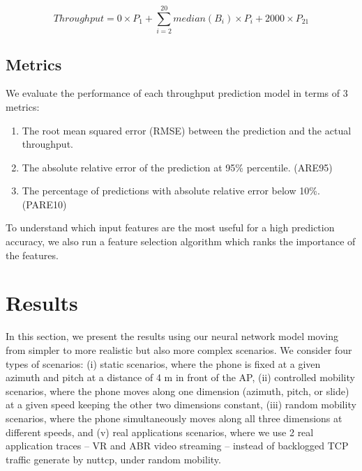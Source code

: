 \documentclass[sigconf,anonymous]{acmart}
\begin{document}
\begin{equation}
Throughput = 0 \times P_{1} + \sum_{i=2}^{20} median(B_{i}) \times P_{i} + 2000 \times P_{21}
\end{equation}


\subsection{Metrics}
We evaluate the performance of each throughput prediction model in terms of 3 metrics:

\begin{enumerate}
    \item The root mean squared error (RMSE) between the prediction and the actual throughput.
    \item The absolute relative error of the prediction at 95\% percentile. (ARE95)
    \item The percentage of predictions with absolute relative error below 10\%. (PARE10)
\end{enumerate}

To understand which input features are the most useful for a high prediction accuracy, we also run a feature selection algorithm which ranks the importance of the features.

\section{Results} %
\label{section: Results}

In this section, we present the results using our neural network model moving from simpler to more realistic but also more complex scenarios. We consider four types of scenarios: (i) static scenarios, where the phone is fixed at a given azimuth and pitch at a distance of 4 m in front of the AP, (ii) controlled mobility scenarios, where the phone moves along one dimension (azimuth, pitch, or slide) at a given speed keeping the other two dimensions constant, (iii) random mobility scenarios, where the phone simultaneously moves along all three dimensions at different speeds, and (v) real applications scenarios, where we use 2 real application traces -- VR and ABR video streaming -- instead of backlogged TCP traffic generate by nuttcp, under random mobility. 
\end{document}
